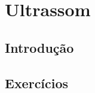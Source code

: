 \chapter{Ultrassom}

\section*{Introdução}

\section{Exercícios}

\question{}

\question{}

\question{}

\question{}

\question{}


